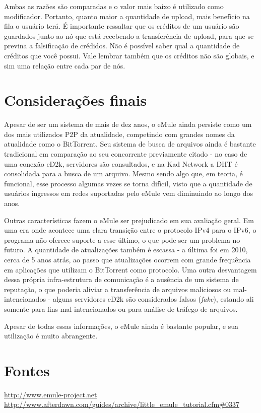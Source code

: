 \documentclass[a4paper]{article}
\begin{document}
Ambas as razões são comparadas e o valor mais baixo é utilizado como modificador. Portanto, quanto maior a quantidade de upload, mais benefício na fila o usuário terá. É importante ressaltar que os créditos de um usuário são guardados junto ao nó que está recebendo a transferência de upload, para que se previna a falsificação de crédidos. Não é possível saber qual a quantidade de créditos que você possui. Vale lembrar também que os créditos não são globais, e sim uma relação entre cada par de nós.

\section{Considerações finais}
	Apesar de ser um sistema de mais de dez anos, o eMule ainda persiste como um dos mais utilizados P2P da atualidade, competindo com grandes nomes da atualidade como o BitTorrent. Seu sistema de busca de arquivos ainda é bastante tradicional em comparação ao seu concorrente previamente citado - no caso de uma conexão eD2k, servidores são consultados, e na Kad Network a DHT é consolidada para a busca de um arquivo. Mesmo sendo algo que, em teoria, é funcional, esse processo algumas vezes se torna difícil, visto que a quantidade de usuários ingressos em redes suportadas pelo eMule vem diminuindo ao longo dos anos.
    
    Outras características fazem o eMule ser prejudicado em sua avaliação geral. Em uma era onde acontece uma clara transição entre o protocolo IPv4 para o IPv6, o programa não oferece suporte a esse último, o que pode ser um problema no futuro. A quantidade de atualizações também é escassa - a última foi em 2010, cerca de 5 anos atrás, ao passo que atualizações ocorrem com grande frequência em aplicações que utilizam o BitTorrent como protocolo. Uma outra desvantagem dessa própria infra-estrutura de comunicação é a ausência de um sistema de reputação, o que poderia aliviar a transferência de arquivos maliciosos ou mal-intencionados - alguns servidores eD2k são considerados falsos (\textit{fake}), estando ali somente para fins mal-intencionados ou para análise de tráfego de arquivos.
    
    Apesar de todas essas informações, o eMule ainda é bastante popular, e sua utilização é muito abrangente.


    
    
\section{Fontes}
	\url{http://www.emule-project.net}
    \url{http://www.afterdawn.com/guides/archive/little_emule_tutorial.cfm#0337}
	
\end{document}
